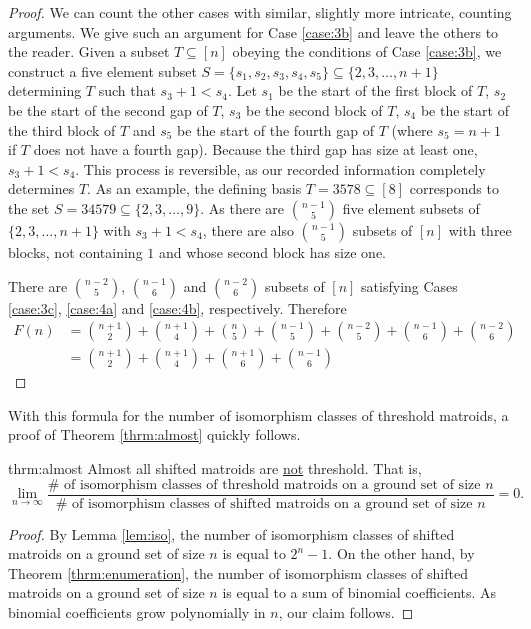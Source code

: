 \documentclass{amsart}
\theoremstyle{definition}
\theoremstyle{plain}
\begin{document}
\begin{proof}
 We can count the other cases with similar, slightly more intricate, counting arguments. We give such an argument for Case \ref{case:3b} and leave the others to the reader. Given a subset $T\subseteq [n]$ obeying the conditions of Case \ref{case:3b}, we construct a five element subset $S=\{s_{1},s_{2},s_{3},s_{4},s_{5}\}\subseteq \{2,3,\ldots,n+1\}$ determining $T$ such that $s_{3}+1<s_{4}$. Let $s_{1}$ be the start of the first block of $T$, $s_{2}$ be the start of the second gap of $T$, $s_{3}$ be the second block of $T$, $s_{4}$ be the start of the third block of $T$ and $s_{5}$ be the start of the fourth gap of $T$ (where $s_{5}=n+1$ if $T$ does not have a fourth gap). Because the third gap has size at least one, $s_{3}+1<s_{4}$. This process is reversible, as our recorded information completely determines $T$. As an example, the defining basis $T=3578\subseteq [8]$ corresponds to the set $S=34579\subseteq \{2,3,\ldots,9\}$. As there are $\binom{n-1}{5}$ five element subsets of $\{2,3,\ldots,n+1\}$ with $s_3+1<s_4$, there are also $\binom{n-1}{5}$ subsets of $[n]$ with three blocks, not containing $1$ and whose second block has size one.

 There are $\binom{n-2}{5}$, $\binom{n-1}{6}$ and $\binom{n-2}{6}$ subsets of $[n]$ satisfying Cases \ref{case:3c}, \ref{case:4a} and \ref{case:4b}, respectively. Therefore
 \begin{align*}
 \label{eq:2}
   F(n) &= \binom{n+1}{2}+ \binom{n+1}{4} + \binom{n}{5}+ \binom{n-1}{5} + \binom{n-2}{5} + \binom{n-1}{6} + \binom{n-2}{6}\\
          &= \binom{n+1}{2} + \binom{n+1}{4} + \binom{n+1}{6} + \binom{n-1}{6}
 \end{align*}
 
\end{proof}  

With this formula for the number of isomorphism classes of threshold matroids, a proof of Theorem \ref{thrm:almost} quickly follows.

\begin{repintrotheorem}{thrm:almost}
  Almost all shifted matroids are \underline{not} threshold. That is,
  \[\lim_{n\to\infty}\frac{\text{$\#$ of isomorphism classes of threshold matroids on a ground set of size $n$}}{\text{$\#$ of isomorphism classes of shifted matroids on a ground set of size $n$}}=0. \]
\end{repintrotheorem}
\begin{proof}
  By Lemma \ref{lem:iso}, the number of isomorphism classes of shifted matroids on a ground set of size $n$ is equal to $2^n-1$. On the other hand, by Theorem \ref{thrm:enumeration}, the number of isomorphism classes of shifted matroids on a ground set of size $n$ is equal to a sum of binomial coefficients. As binomial coefficients grow polynomially in $n$, our claim follows.
\end{proof}
\end{document}
